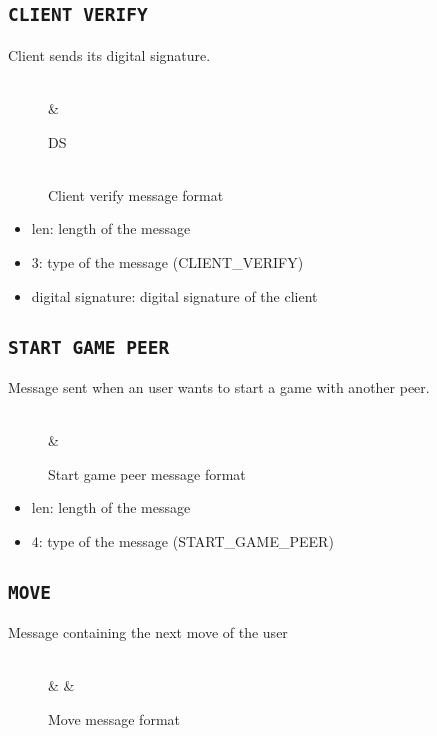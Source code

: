 \subsection{\texttt{CLIENT VERIFY}}
Client sends its digital signature.
\begin{figure}[h]
	\centering
	\begin{bytefield}[bitwidth=1.1em]{32}
		 \\
		&  \\
		\begin{rightwordgroup}{DS}
			 \\
			 \\
		\end{rightwordgroup}
	\end{bytefield}
	\caption{Client verify message format}
\end{figure}

\begin{itemize}
	\item len: length of the message
	\item 3: type of the message (CLIENT\_VERIFY)
	\item digital signature: digital signature of the client
\end{itemize}

\subsection{\texttt{START GAME PEER}}
Message sent when an user wants to start a game with another peer.
\begin{figure}[h]
	\centering
	\begin{bytefield}[bitwidth=1.1em]{32}
		 \\
		& 
	\end{bytefield}
	\caption{Start game peer message format}
\end{figure}

\begin{itemize}
	\item len: length of the message
	\item 4: type of the message (START\_GAME\_PEER)
\end{itemize}

\subsection{\texttt{MOVE}}
Message containing the next move of the user
\begin{figure}[!htbp]
	\centering
	\begin{bytefield}[bitwidth=1.1em]{32}
		 \\
		& 
		& 
	\end{bytefield}
	\caption{Move message format}
\end{figure}

